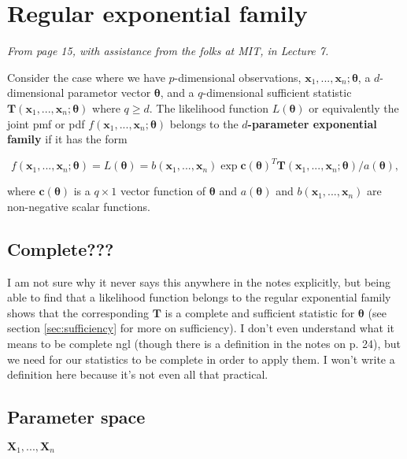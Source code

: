 \section{Regular exponential family}\label{sec:reg exp fam}

\textit{From page 15, with assistance from the folks at MIT, \autocite{MIT} in Lecture 7.}

Consider the case where we have \(p\)-dimensional observations, \(\bm{x}_1,...,\bm{x}_n;\bm{\theta}\), 
a \(d\)-dimensional parametor vector \(\bm{\theta}\), 
and a \(q\)-dimensional sufficient statistic \(\bm{T}(\bm{x}_1,...,\bm{x}_n;\bm{\theta})\) where \(q\geq d\). 
The likelihood function \(L(\bm{\theta})\) or equivalently the joint 
pmf or pdf \(f(\bm{x}_1,...,\bm{x}_n;\bm{\theta})\) belongs to the 
\textbf{\(d\)-parameter exponential family} if it has the form

\begin{equation}\label{eq:exp family}
    f(\bm{x}_1,...,\bm{x}_n;\bm{\theta}) = L(\bm{\theta}) = b(\bm{x}_1,...,\bm{x}_n)\exp{\bm{c}(\bm{\theta})^T \bm{T}(\bm{x}_1,...,\bm{x}_n;\bm{\theta})/a(\bm{\theta})},
\end{equation}

where \(\bm{c}(\bm{\theta})\) is a \(q\times 1\) vector function of \(\bm{\theta}\) and \(a(\bm{\theta})\) and \(b(\bm{x}_1,...,\bm{x}_n)\) 
are non-negative scalar functions. 


\subsection{Complete???}\label{sec:complete}

I am not sure why it never says this anywhere in the notes explicitly, but being able to find that a likelihood function belongs to the regular exponential family shows that the corresponding \(\bm{T}\) is a complete and sufficient statistic for \(\bm{\theta}\) (see section \ref{sec:sufficiency} for more on sufficiency). 
I don't even understand what it means to be complete ngl (though there is a definition in the notes on p. 24), but we need for our statistics to be complete in order to apply them. 
I won't write a definition here because it's not even all that practical. 

\subsection{Parameter space}\label{sec:param space}

\(\bm{X}_1,...,\bm{X}_n\)




